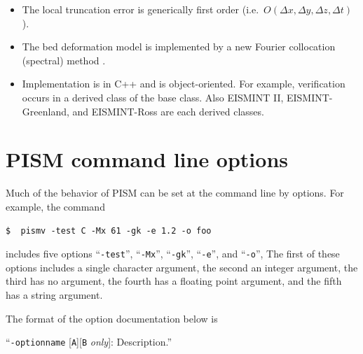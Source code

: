 \documentclass[11pt,final]{amsart}
\begin{document}
\begin{itemize}
\item The local truncation error is generically first order (i.e.~$O(\Delta x,\Delta y,\Delta z,\Delta t)$).
\item The bed deformation model is implemented by a new Fourier collocation (spectral) method \cite{BLKfastearth}.
\item Implementation is in C++ and is object-oriented.  For example, verification occurs in a derived class of the base class.  Also EISMINT II, EISMINT-Greenland, and EISMINT-Ross are each derived classes.
\end{itemize}


\clearpage\newpage



\appendix

\newcommand{\subsect}[1]{\bigskip\subsection{#1}\rule{0mm}{2mm}\par\medskip}
\newcommand{\subsubsect}[1]{\medskip\subsubsection{#1}\rule{0mm}{2mm}\par\smallskip}

\clearpage\newpage
\section{PISM command line options}\label{sect:options}

Much of the behavior of PISM can be set at the command line by options.  For example, the command 

\verb|$  pismv -test C -Mx 61 -gk -e 1.2 -o foo|

\noindent includes five options ``\verb|-test|'', ``\verb|-Mx|'', ``\verb|-gk|'', ``\verb|-e|'', and ``\verb|-o|'',  The first of these options includes a single character argument, the second an integer argument, the third has no argument, the fourth has a floating point argument, and the fifth has a string argument.

The format of the option documentation below is

\centerline{``\large\texttt{-optionname} [\texttt{A}][\texttt{B} \emph{only}]: \quad Description.\normalsize''}
\end{document}
